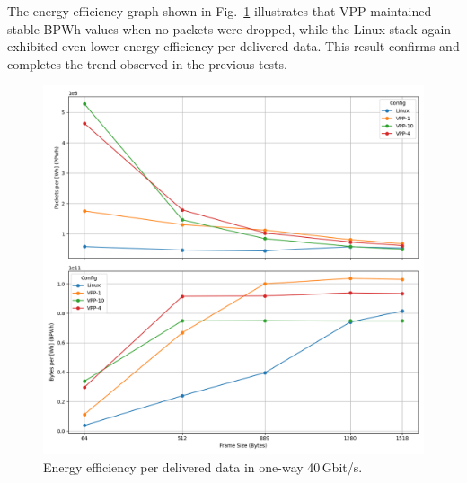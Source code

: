 The energy efficiency graph shown in Fig.~\ref{fig:40g} illustrates that VPP maintained stable BPWh values when no packets were dropped, 
while the Linux stack again exhibited even lower energy efficiency per delivered data.
This result confirms and completes the trend observed in the previous tests.


\begin{figure}[!htbp]
    \centering
    \includegraphics[width=\linewidth]{images/consumption-40g.png}
    \caption{Energy efficiency per delivered data in one-way 40\,Gbit/s.}
    \label{fig:40g}
\end{figure}

